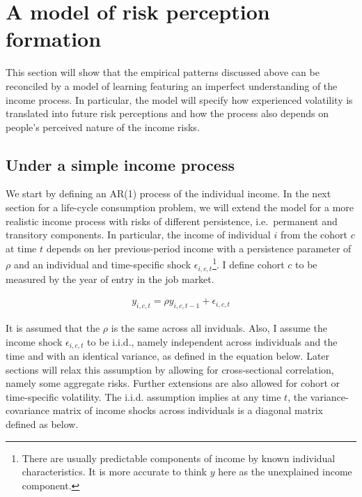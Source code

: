 \documentclass[12pt,notitlepage,onecolumn,aps,pra]{article}
\begin{document}
    \hypertarget{a-model-of-risk-perception-formation}{%
\section{A model of risk perception
formation}\label{a-model-of-risk-perception-formation}}

This section will show that the empirical patterns discussed above can
be reconciled by a model of learning featuring an imperfect
understanding of the income process. In particular, the model will
specify how experienced volatility is translated into future risk
perceptions and how the process also depends on people's perceived
nature of the income risks.

\hypertarget{under-a-simple-income-process}{%
\subsection{Under a simple income
process}\label{under-a-simple-income-process}}

We start by defining an AR(1) process of the individual income. In the
next section for a life-cycle consumption problem, we will extend the
model for a more realistic income process with risks of different
persistence, i.e.~permanent and transitory components. In particular,
the income of individual \(i\) from the cohort \(c\) at time \(t\)
depends on her previous-period income with a persistence parameter of
\(\rho\) and an individual and time-specific shock
\(\epsilon_{i,c,t}\)\footnote{There are usually predictable components of income by known individual characteristics. It is more accurate to think $y$ here as the unexplained income component.}.
I define cohort \(c\) to be measured by the year of entry in the job
market.

\begin{eqnarray}
y_{i,c,t} = \rho y_{i,c,t-1} + \epsilon_{i,c,t}
\end{eqnarray}

It is assumed that the \(\rho\) is the same across all inviduals. Also,
I assume the income shock \(\epsilon_{i,c,t}\) to be i.i.d., namely
independent across individuals and the time and with an identical
variance, as defined in the equation below. Later sections will relax
this assumption by allowing for cross-sectional correlation, namely some
aggregate risks. Further extensions are also allowed for cohort or
time-specific volatility. The i.i.d. assumption implies at any time
\(t\), the variance-covariance matrix of income shocks across
individuals is a diagonal matrix defined as below.
\end{document}
